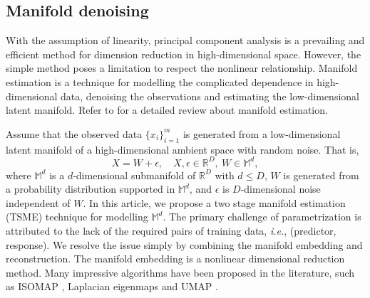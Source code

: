 \subsection{Manifold denoising}

With the assumption of linearity, principal component analysis is a prevailing and efficient method for dimension reduction in high-dimensional space. However, the simple method poses a limitation to respect the nonlinear relationship. 
Manifold estimation is a technique for modelling the complicated dependence in high-dimensional data, denoising the observations and estimating the low-dimensional latent manifold. Refer to \citet{doi:10.1073/pnas.2311436121} for a detailed review about manifold estimation. 

Assume that the observed data $\{x_i\}_{i=1}^m$ is generated from a low-dimensional latent manifold of a high-dimensional ambient space with random noise. That is,
\begin{equation*}
    X=W+\epsilon, \quad X,\epsilon\in \mathbb{R}^D,~W\in \mathbb{M}^d,
\end{equation*}
where $\mathbb{M}^d$ is a $d$-dimensional submanifold of $\mathbb{R}^D$ with $d\leq D$, $W$ is generated from a probability distribution supported in $\mathbb{M}^d$, and $\epsilon$ is $D$-dimensional noise independent of $W$. %
In this article, we propose a two stage manifold estimation (TSME) technique for modelling $\mathbb{M}^d$. The primary challenge of parametrization is attributed to the lack of the required pairs of training data, \emph{i.e.}, (predictor, response). %
We resolve the issue simply by combining the manifold embedding and reconstruction. The manifold embedding is a nonlinear dimensional reduction method. Many impressive algorithms have been proposed in the literature, such as ISOMAP \citep{balasubramanian2002isomap}, Laplacian eigenmaps \citep{belkin2003laplacian} and UMAP \citep{mcinnes2018umap}. 

